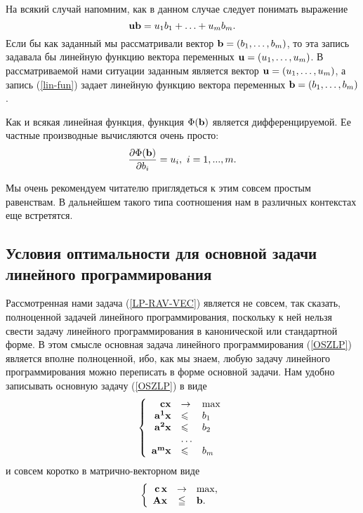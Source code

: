         На всякий случай напомним, как в данном случае следует понимать
    выражение
\begin{equation}\label{lin-fun}
    \mathbf{u}\mathbf{b}=u_{1}b_{1}+\ldots+u_{m}b_{m}.
\end{equation}
    Если бы как заданный мы рассматривали вектор
    $\mathbf{b}=(b_{1},\ldots,b_{m})$, то эта запись задавала бы линейную функцию
    вектора переменных $\mathbf{u}=(u_{1},\ldots,u_{m})$. В рассматриваемой нами ситуации
    заданным является вектор $\mathbf{u}=(u_{1},\ldots,u_{m})$, а запись
    (\ref{lin-fun}) задает линейную функцию вектора переменных
    $\mathbf{b}=(b_{1},\ldots,b_{m})$.

    Как и всякая линейная функция, функция $\Phi(\mathbf{b})$ является
    дифференцируемой. Ее частные производные вычисляются очень
    просто:
\begin{equation}\label{proizvodnaya-lin-fun}
    \frac{\partial\Phi(\vc{b})}{\partial b_{i}}=u_{i},\ i=1,...,m.
\end{equation}

    Мы очень рекомендуем читателю приглядеться к этим совсем простым
    равенствам. В дальнейшем такого типа соотношения нам в различных
    контекстах еще встретятся.


\subsection{Условия оптимальности для основной задачи линейного
программирования}

Рассмотренная нами задача (\ref{LP-RAV-VEC}) является не совсем, так
сказать, полноценной задачей линейного программирования, поскольку к
ней нельзя свести задачу линейного программирования в канонической
или стандартной форме. В этом смысле основная задача линейного
программирования (\ref{OSZLP}) является вполне полноценной, ибо, как
мы знаем, любую задачу линейного программирования можно переписать в
форме основной задачи. Нам удобно записывать основную задачу
(\ref{OSZLP}) в виде
\begin{equation}\label{PSZLP}
\left\{
\begin{array}{rll}
\mathbf{c}\mathbf{x} &\to & \max\\
\mathbf{a^{1}}\mathbf{x} &\leqslant& b_1 \\
\mathbf{a^{2}}\mathbf{x} &\leqslant& b_2\\
                      & \ldots &\\
\mathbf{a^{m}}\mathbf{x}  &\leqslant& b_m\\
\end{array} \right.
\end{equation}
и совсем коротко в матрично-векторном виде
\begin{equation}\label{PSZLPV}
\left\{
\begin{array}{rcl}
 \mathbf{c} \, \mathbf{x} & \to & \max,  \\
 \mathbf{A} \mathbf{x} &\leqq & \mathbf{b}. \\
 \end{array} \right.
\end{equation}

